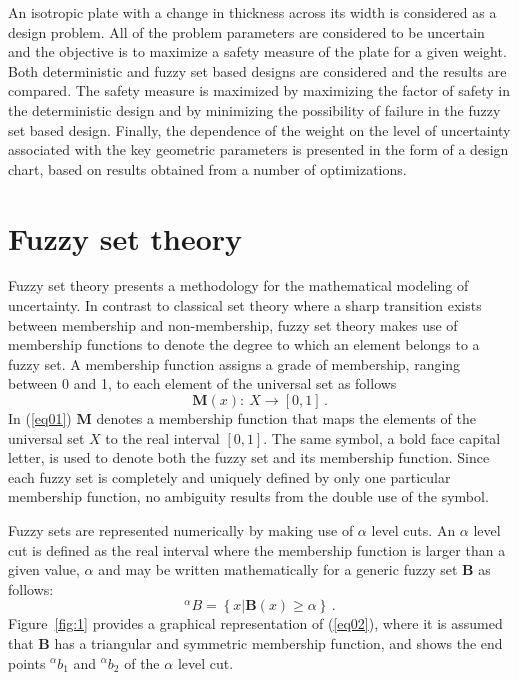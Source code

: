 \documentclass[stropt]{svjour}
\def\m{\mathbf{M}}%
\def\b{\mathbf{B}}%
\begin{document}
An isotropic plate with a change in thickness across its width is considered
as a design problem.
All of the problem parameters are considered to be uncertain and the
objective is to maximize a safety measure of the plate for a given weight.
Both deterministic and fuzzy set based designs are considered and the results
are compared.
The safety measure is maximized by maximizing the factor of safety in the
deterministic design and by minimizing the possibility of failure in the
fuzzy set based design.
Finally, the dependence of the weight on the level of uncertainty
associated with the key geometric parameters is presented in the form of a
design chart, based on results obtained from a number of optimizations.


\section{Fuzzy set theory}
\label{sec02}

Fuzzy set theory presents a methodology for the mathematical modeling of
uncertainty.
In contrast to classical set theory where a sharp transition exists between
membership and non-membership, fuzzy set theory makes use of membership
functions to denote the degree to which an element belongs to a fuzzy set.
A membership function assigns a grade of membership, ranging between 0 and 1,
to each element of the universal set as follows
\begin{equation}
\m (x):~X\rightarrow [0,1]\, . \label{eq01}
\end{equation}
In (\ref{eq01}) $\m$ denotes a membership function that maps the elements of
the universal set $X$ to the real interval $[0,1]$.
The same symbol, a bold face capital letter, is used to denote both the fuzzy
set and its membership function.
Since each fuzzy set is completely and uniquely defined by only one particular
membership function, no ambiguity results from the double use of the symbol.

Fuzzy sets are represented numerically by making use of $\alpha$ level cuts.
An $\alpha$ level cut is defined as the real interval where the membership
function is larger than a given value, $\alpha$ \citep[p.~19]{Klir95}
and may be written mathematically for a generic
fuzzy set $\b$ as follows:
\begin{equation}
^{\alpha}B=\left\{ x | \b (x)\geq\alpha\right\}\, . \label{eq02}
\end{equation}
Figure~\ref{fig:1} provides a graphical representation of (\ref{eq02}), where
it is assumed that $\b$ has a triangular and symmetric membership function,
and shows the end points $^{\alpha}b_1$ and $^{\alpha}b_2$ of the $\alpha$
level cut.
\end{document}
